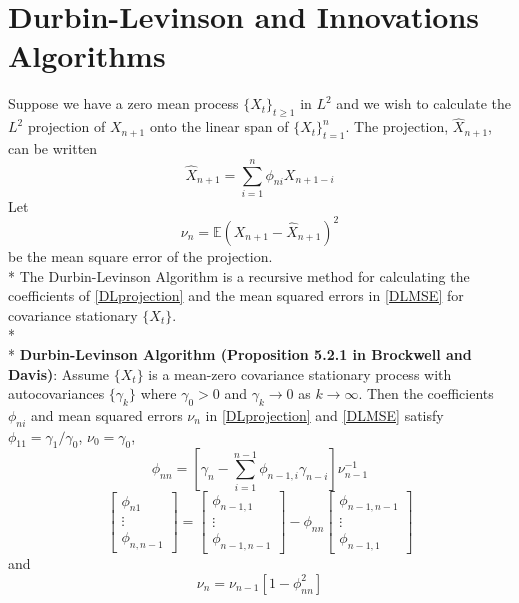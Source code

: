 \documentclass[11pt]{article}
\begin{document}
\section{Durbin-Levinson and Innovations Algorithms}
Suppose we have a zero mean process $\{ X_t \}_{t \geq 1 }$ in $L^2$ and we wish to calculate the $L^2$ projection of $X_{n+1}$ onto the linear span of $\{ X_t \}_{t = 1}^n$. The projection, $\widehat{X}_{n+1}$, can be written
\begin{equation} \label{DLprojection}
\widehat{X}_{n+1} = \sum_{i=1}^n \phi_{ni} X_{n+1 - i}
\end{equation}
Let
\begin{equation} \label{DLMSE}
\nu_n = \mathbb{E} \left( X_{n+1} - \widehat{X}_{n+1} \right)^2
\end{equation}
be the mean square error of the projection.
\\*
The Durbin-Levinson Algorithm is a recursive method for calculating the coefficients of \eqref{DLprojection} and the mean squared errors in \eqref{DLMSE} for covariance stationary $\{ X_t \}$.
\\*
\\*
{\bf Durbin-Levinson Algorithm (Proposition 5.2.1 in Brockwell and Davis)}: Assume $\{ X_t \}$ is a mean-zero covariance stationary process with autocovariances $\{ \gamma_k \}$ where $\gamma_0 > 0$ and $\gamma_k \rightarrow 0$ as $k \rightarrow \infty$. Then the coefficients $\phi_{ni}$ and mean squared errors $\nu_n$ in \eqref{DLprojection} and \eqref{DLMSE} satisfy $\phi_{11} = \gamma_1 / \gamma_0$, $\nu_0 = \gamma_0$,
\begin{equation}
\phi_{nn} = \left[ \gamma_n - \sum_{i=1}^{n-1} \phi_{n-1,i} \gamma_{n-i} \right] \nu_{n-1}^{-1}
\end{equation}
\begin{equation}
\begin{bmatrix}
\phi_{n1} \\
\vdots  \\
\phi_{n,n-1}
\end{bmatrix}
=
\begin{bmatrix}
\phi_{n-1,1} \\
\vdots  \\
\phi_{n-1,n-1}
\end{bmatrix}
- \phi_{nn}
\begin{bmatrix}
\phi_{n-1,n-1} \\
\vdots  \\
\phi_{n-1,1}
\end{bmatrix}
\end{equation}
and
\begin{equation}
\nu_n = \nu_{n-1} \left[ 1 - \phi_{nn}^2 \right]
\end{equation}
\end{document}
